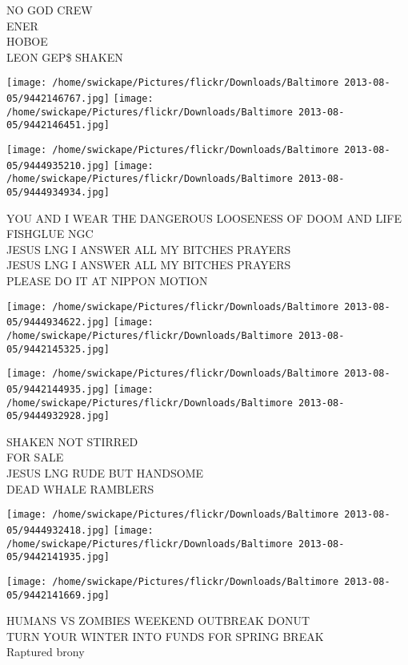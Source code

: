 \documentclass[10pt,letterpaper]{article}
\begin{document}
NO GOD CREW\\
ENER\\
HOBOE\\
LEON GEP\$ SHAKEN\\
\pagebreak

\texttt{[image: /home/swickape/Pictures/flickr/Downloads/Baltimore 2013-08-05/9442146767.jpg]}
\texttt{[image: /home/swickape/Pictures/flickr/Downloads/Baltimore 2013-08-05/9442146451.jpg]}

\texttt{[image: /home/swickape/Pictures/flickr/Downloads/Baltimore 2013-08-05/9444935210.jpg]}
\texttt{[image: /home/swickape/Pictures/flickr/Downloads/Baltimore 2013-08-05/9444934934.jpg]}

YOU AND I WEAR THE DANGEROUS LOOSENESS OF DOOM AND LIFE FISHGLUE NGC\\
JESUS LNG I ANSWER ALL MY BITCHES PRAYERS\\
JESUS LNG I ANSWER ALL MY BITCHES PRAYERS\\
PLEASE DO IT AT NIPPON MOTION\\
\pagebreak

\texttt{[image: /home/swickape/Pictures/flickr/Downloads/Baltimore 2013-08-05/9444934622.jpg]}
\texttt{[image: /home/swickape/Pictures/flickr/Downloads/Baltimore 2013-08-05/9442145325.jpg]}

\texttt{[image: /home/swickape/Pictures/flickr/Downloads/Baltimore 2013-08-05/9442144935.jpg]}
\texttt{[image: /home/swickape/Pictures/flickr/Downloads/Baltimore 2013-08-05/9444932928.jpg]}

SHAKEN NOT STIRRED\\
FOR SALE\\
JESUS LNG RUDE BUT HANDSOME\\
DEAD WHALE RAMBLERS\\
\pagebreak

\texttt{[image: /home/swickape/Pictures/flickr/Downloads/Baltimore 2013-08-05/9444932418.jpg]}
\texttt{[image: /home/swickape/Pictures/flickr/Downloads/Baltimore 2013-08-05/9442141935.jpg]}

\vspace{0.25in}
\texttt{[image: /home/swickape/Pictures/flickr/Downloads/Baltimore 2013-08-05/9442141669.jpg]}

HUMANS VS ZOMBIES WEEKEND OUTBREAK DONUT\\
TURN YOUR WINTER INTO FUNDS FOR SPRING BREAK\\
Raptured brony\\
\pagebreak
\end{document}
